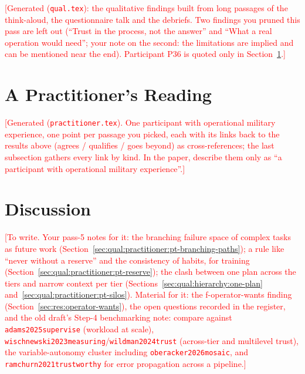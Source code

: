 \documentclass[10pt]{article}
\theoremstyle{definition}
\newcommand{\todo}[1]{\textcolor{red}{[#1]}}
\begin{document}
\todo{Generated (\texttt{qual.tex}): the qualitative findings built from long passages of the think-aloud, the
questionnaire talk and the debriefs. Two findings you pruned this pass are left out (``Trust in the process, not the
answer'' and ``What a real operation would need''; your note on the second: the limitations are implied and can be
mentioned near the end). Participant P36 is quoted only in Section~\ref{sec:practitioner}.}



\section{A Practitioner's Reading}\label{sec:practitioner}

\todo{Generated (\texttt{practitioner.tex}). One participant with operational military experience, one point per
passage you picked, each with its links back to the results above (agrees / qualifies / goes beyond) as
cross-references; the last subsection gathers every link by kind. In the paper, describe them only as ``a participant
with operational military experience''.}



\section{Discussion}\label{sec:discussion}

\todo{To write. Your pass-5 notes for it: the branching failure space of complex tasks as future work
(Section~\ref{sec:qual:practitioner:pt-branching-paths}); a rule like ``never without a reserve'' and the consistency
of habits, for training (Section~\ref{sec:qual:practitioner:pt-reserve}); the clash between one plan across the tiers
and narrow context per tier (Sections~\ref{sec:qual:hierarchy:one-plan} and~\ref{sec:qual:practitioner:pt-silos}).
Material for it: the f-operator-wants finding (Section~\ref{sec:res:operator-wants}), the
open questions recorded in the register, and the old draft's Step-4 benchmarking note: compare against
\texttt{adams2025supervise} (workload at scale), \texttt{wischnewski2023measuring}/\texttt{wildman2024trust}
(across-tier and multilevel trust), the variable-autonomy cluster including \texttt{oberacker2026mosaic}, and
\texttt{ramchurn2021trustworthy} for error propagation across a pipeline.}
\end{document}
